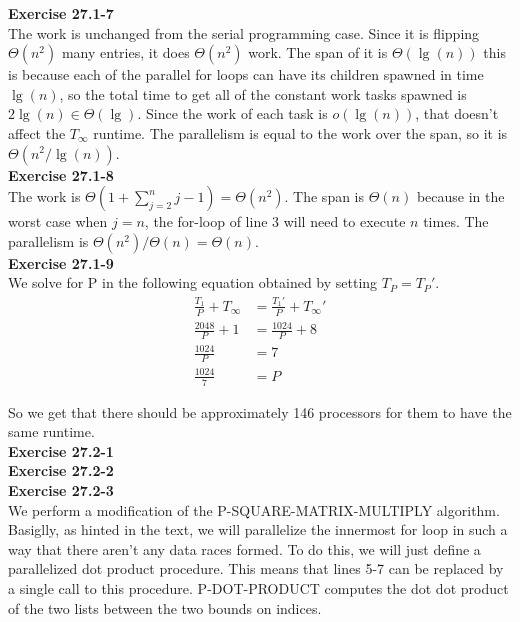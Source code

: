\documentclass{article}
\begin{document}
\noindent\textbf{Exercise 27.1-7}\\

The work is unchanged from the serial programming case. Since it is flipping $\Theta(n^2)$ many entries, it does $\Theta(n^2)$ work. The span of it is $\Theta(\lg(n))$ this is because each of the parallel for loops can have its children spawned in time $\lg(n)$, so the total time to get all of the constant work tasks spawned is $2\lg(n) \in \Theta(\lg)$. Since the work of each task is $o(\lg(n))$, that doesn't affect the $T_\infty$ runtime. The parallelism is equal to the work over the span, so it is $\Theta(n^2/\lg(n))$.\\

\noindent\textbf{Exercise 27.1-8}\\

The work is $\Theta(1 + \sum_{j=2}^n j-1) = \Theta(n^2)$. The span is $\Theta(n)$ because in the worst case when $j=n$, the for-loop of line 3 will need to execute $n$ times.  The parallelism is $\Theta(n^2) / \Theta(n) = \Theta(n)$.\\

\noindent\textbf{Exercise 27.1-9}\\

We solve for P in the following equation obtained by setting $T_P = T_P'$.
\begin{align*}
\frac{T_1}{P}+T_\infty &= \frac{T_1'}{P} + T_\infty'\\
\frac{2048}{P} + 1 &= \frac{1024}{P}+8\\
\frac{1024}{P} &= 7\\
\frac{1024}{7} &=P
\end{align*}

So we get that there should be approximately 146 processors for them to have the same runtime.\\



\noindent\textbf{Exercise 27.2-1}\\


\noindent\textbf{Exercise 27.2-2}\\


\noindent\textbf{Exercise 27.2-3}\\

We perform a modification of the P-SQUARE-MATRIX-MULTIPLY algorithm. Basiglly, as hinted in the text, we will parallelize the innermost for loop in such a way that there aren't any data races formed. To do this, we will just define a parallelized dot product procedure. This means that lines 5-7 can be replaced by a single call to this procedure. P-DOT-PRODUCT computes the dot dot product of the two lists between the two bounds on indices.
\end{document}
